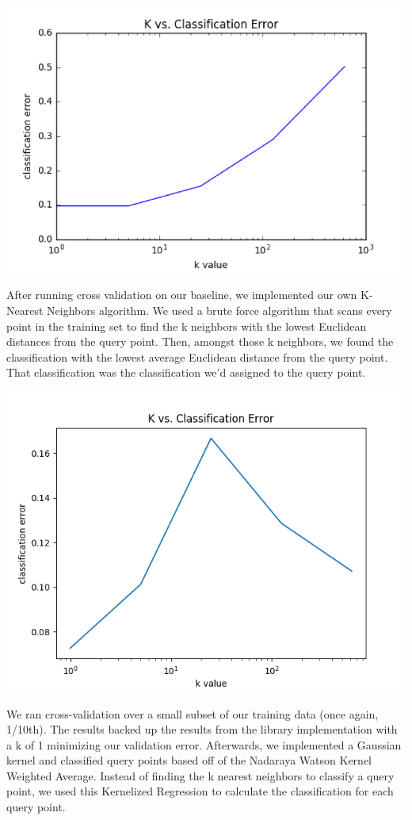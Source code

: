 \documentclass{article} %
\begin{document}
\includegraphics[width=\textwidth]{sklearn-knn-cv.png}

After running cross validation on our baseline, we implemented our own
K-Nearest Neighbors algorithm. We used a brute force algorithm that scans
every point in the training set to find the k neighbors with the lowest
Euclidean distances from the query point. Then, amongst those k neighbors,
we found the classification with the lowest average Euclidean distance from
the query point. That classification was the classification we’d assigned to
the query point.

\includegraphics[width=\textwidth]{k-nn.png}

We ran cross-validation over a small subset of our training data (once again,
1/10th).
The results backed up the results from the library implementation with a k
of 1 minimizing our validation error. 
Afterwards, we implemented a Gaussian kernel and classified query points
based off of the Nadaraya Watson Kernel Weighted Average. Instead of finding
the k nearest neighbors to classify a query point, we used this Kernelized
Regression to calculate the classification for each query point.
\end{document}
